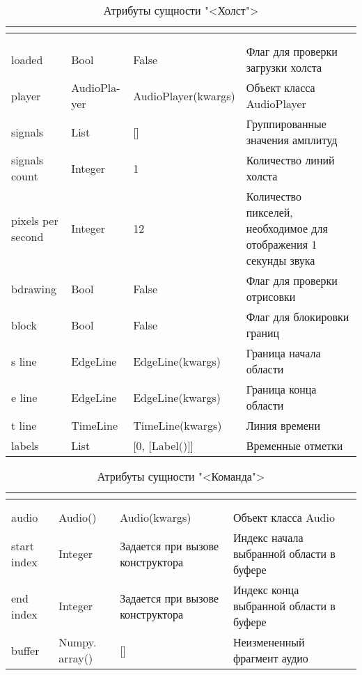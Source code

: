 \begin{xltabular}{\textwidth}{|p{2cm}|p{2cm}|l|X|}
	\caption{Атрибуты сущности "<Холст">}\\ \hline
	\label{news4:table}
	 &  &  &  \\ \hline
	 &  &  &  \\ \hline
	\endfirsthead
	 &  &  &  \\ \hline
	\finishhead
	loaded & Bool & False & Флаг для проверки загрузки холста \\ \hline 
	player & AudioPla- yer & AudioPlayer(kwargs) & Объект класса AudioPlayer \\ \hline 
	signals & List & [] & Группированные значения амплитуд \\ \hline 
	signals count & Integer & 1 & Количество линий холста \\ \hline 
	pixels per second & Integer & 12 & Количество пикселей, необходимое для отображения 1 секунды звука \\ \hline 
	bdrawing & Bool & False & Флаг для проверки отрисовки \\ \hline 
	block & Bool & False & Флаг для блокировки границ \\ \hline 
	s line & EdgeLine & EdgeLine(kwargs) & Граница начала области \\ \hline 
	e line & EdgeLine & EdgeLine(kwargs) & Граница конца области \\ \hline 
	t line & TimeLine & TimeLine(kwargs) & Линия времени \\ \hline 
	labels & List & [0, [Label()]] & Временные отметки
\end{xltabular}

\begin{xltabular}{\textwidth}{|p{2cm}|p{2cm}|l|X|}
	\caption{Атрибуты сущности "<Команда">}\\ \hline
	\label{news5:table}
	 &  &  &  \\ \hline
	 &  &  &  \\ \hline
	\endfirsthead
	 &  &  &  \\ \hline
	\finishhead
	audio & Audio() & Audio(kwargs) & Объект класса Audio \\ \hline 
	start index & Integer & Задается при вызове конструктора & Индекс начала выбранной области в буфере \\ \hline 
	end index & Integer & Задается при вызове конструктора & Индекс конца выбранной области в буфере \\ \hline 
	buffer & Numpy. array() & [] & Неизмененный фрагмент аудио
\end{xltabular}

